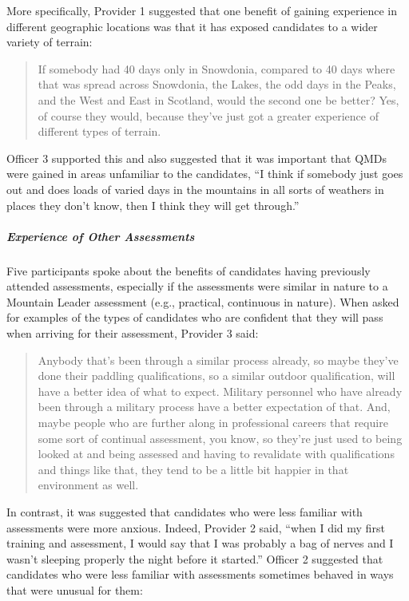 \documentclass[
  12pt,
  a4paper,
]{book}
\begin{document}
More specifically, Provider 1 suggested that one benefit of gaining experience in different geographic locations was that it has exposed candidates to a wider variety of terrain:

\begin{quote}
If somebody had 40 days only in Snowdonia, compared to 40 days where that was spread across Snowdonia, the Lakes, the odd days in the Peaks, and the West and East in Scotland, would the second one be better? Yes, of course they would, because they've just got a greater experience of different types of terrain.
\end{quote}

Officer 3 supported this and also suggested that it was important that QMDs were gained in areas unfamiliar to the candidates, ``I think if somebody just goes out and does loads of varied days in the mountains in all sorts of weathers in places they don't know, then I think they will get through.''

\hypertarget{experience-of-other-assessments}{%
\subparagraph{Experience of Other Assessments}\label{experience-of-other-assessments}}

Five participants spoke about the benefits of candidates having previously attended assessments, especially if the assessments were similar in nature to a Mountain Leader assessment (e.g., practical, continuous in nature). When asked for examples of the types of candidates who are confident that they will pass when arriving for their assessment, Provider 3 said:

\begin{quote}
Anybody that's been through a similar process already, so maybe they've done their paddling qualifications, so a similar outdoor qualification, will have a better idea of what to expect. Military personnel who have already been through a military process have a better expectation of that. And, maybe people who are further along in professional careers that require some sort of continual assessment, you know, so they're just used to being looked at and being assessed and having to revalidate with qualifications and things like that, they tend to be a little bit happier in that environment as well.
\end{quote}

In contrast, it was suggested that candidates who were less familiar with assessments were more anxious. Indeed, Provider 2 said, ``when I did my first training and assessment, I would say that I was probably a bag of nerves and I wasn't sleeping properly the night before it started.'' Officer 2 suggested that candidates who were less familiar with assessments sometimes behaved in ways that were unusual for them:
\end{document}
